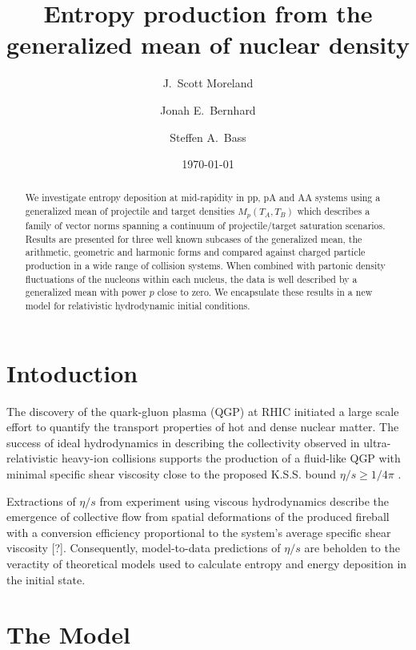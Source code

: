 \documentclass[aps,prl,reprint,amsmath,nofootinbib]{revtex4-1}
\begin{document}
\title{Entropy production from the generalized mean of nuclear density}

\author{J.\ Scott Moreland}
\author{Jonah E.\ Bernhard}
\author{Steffen A.\ Bass}

\date{\today}


\begin{abstract}
   We investigate entropy deposition at mid-rapidity in pp, pA and AA systems using a generalized mean of projectile and target 
densities $M_p(T_A,T_B)$ which describes a family of vector norms spanning a continuum of projectile/target saturation scenarios. 
Results are presented for three well known subcases of the generalized mean, the arithmetic, geometric and harmonic forms and 
compared against charged particle production in a wide range of collision systems. When combined with partonic density fluctuations of 
the nucleons within each nucleus, the data is well described by a generalized mean with power $p$ close to zero. We encapsulate 
these results in a new model for relativistic hydrodynamic initial conditions.
\end{abstract}

\maketitle

\section{Intoduction}

The discovery of the quark-gluon plasma (QGP) at RHIC initiated a large scale effort to quantify the transport properties of 
hot and dense nuclear matter. The success of ideal hydrodynamics in describing the collectivity observed in ultra-relativistic 
heavy-ion collisions supports the production of a fluid-like QGP with minimal specific shear viscosity close to the proposed 
K.S.S. bound $\eta/s \ge 1/4\pi$ \cite{KSS}. 

Extractions of $\eta/s$ from experiment using viscous hydrodynamics describe the emergence of collective flow from spatial 
deformations of the produced fireball with a conversion efficiency proportional to the system's average specific shear viscosity [?]. 
Consequently, model-to-data predictions of $\eta/s$ are beholden to the veractity of theoretical models used to calculate entropy and 
energy deposition in the initial state.

\section{The Model}
\end{document}
